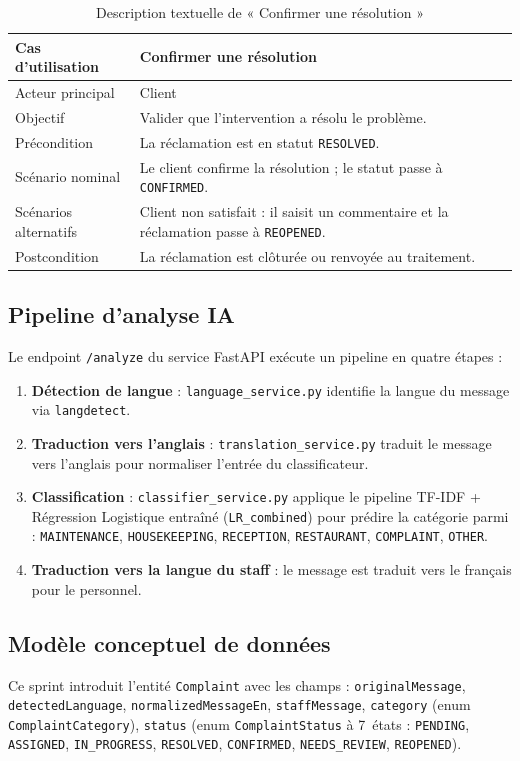 \begin{table}[H]
\centering
\caption{Description textuelle de « Confirmer une résolution »}
\small
\begin{tabularx}{\textwidth}{|p{3.5cm}|X|}
\hline
Cas d'utilisation & Confirmer une résolution \\ \hline
Acteur principal & Client \\ \hline
Objectif & Valider que l'intervention a résolu le problème. \\ \hline
Précondition & La réclamation est en statut \texttt{RESOLVED}. \\ \hline
Scénario nominal & Le client confirme la résolution ; le statut passe à \texttt{CONFIRMED}. \\ \hline
Scénarios alternatifs & Client non satisfait : il saisit un commentaire et la réclamation passe à \texttt{REOPENED}. \\ \hline
Postcondition & La réclamation est clôturée ou renvoyée au traitement. \\ \hline
\end{tabularx}
\end{table}

\subsection{Pipeline d'analyse IA}
Le endpoint \texttt{/analyze} du service FastAPI exécute un pipeline en quatre étapes :
\begin{enumerate}
\item \textbf{Détection de langue} : \texttt{language\_service.py} identifie la langue du message via \texttt{langdetect}.
\item \textbf{Traduction vers l'anglais} : \texttt{translation\_service.py} traduit le message vers l'anglais pour normaliser l'entrée du classificateur.
\item \textbf{Classification} : \texttt{classifier\_service.py} applique le pipeline TF-IDF + Régression Logistique entraîné (\texttt{LR\_combined}) pour prédire la catégorie parmi : \texttt{MAINTENANCE}, \texttt{HOUSEKEEPING}, \texttt{RECEPTION}, \texttt{RESTAURANT}, \texttt{COMPLAINT}, \texttt{OTHER}.
\item \textbf{Traduction vers la langue du staff} : le message est traduit vers le français pour le personnel.
\end{enumerate}

\subsection{Modèle conceptuel de données}
Ce sprint introduit l'entité \texttt{Complaint} avec les champs : \texttt{originalMessage}, \texttt{detectedLanguage}, \texttt{normalizedMessageEn}, \texttt{staffMessage}, \texttt{category} (enum \texttt{ComplaintCategory}), \texttt{status} (enum \texttt{ComplaintStatus} à 7~états : \texttt{PENDING}, \texttt{ASSIGNED}, \texttt{IN\_PROGRESS}, \texttt{RESOLVED}, \texttt{CONFIRMED}, \texttt{NEEDS\_REVIEW}, \texttt{REOPENED}).

